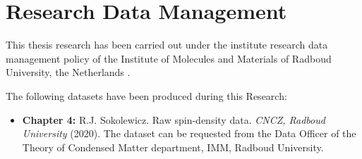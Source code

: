 \chapter{Research Data Management}
This thesis research has been carried out under the institute research data management policy of the Institute of Molecules and Materials of Radboud University, the Netherlands \cite{data_management_policy}.

The following datasets have been produced during this Research:

\begin{itemize}
    \item \textbf{Chapter 4:} R.J. Sokolewicz. Raw spin-density data. \emph{CNCZ, Radboud University} (2020). The dataset can be requested from the Data Officer of the Theory of Condensed Matter department, IMM, Radboud University.
\end{itemize}

